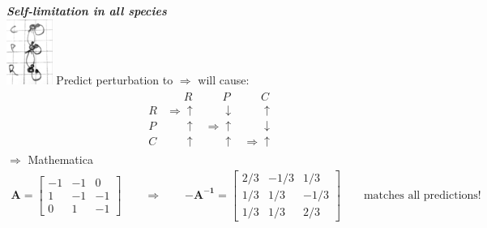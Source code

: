 \documentclass{article}
\newcommand{\ind}{\-\hspace{1cm}}
\begin{document}
\emph{\textbf{Self-limitation in all species}}\\
\ind \includegraphics[width=1.5cm]{figs/TC_full.pdf}
\ind Predict perturbation to $\Rightarrow$ will cause:
\begin{align*}
\begin{matrix}
	 &	\phantom{\Rightarrow} R & \phantom{\Rightarrow}P & \phantom{\Rightarrow}C\\
	R &	\Rightarrow \uparrow & \phantom{\Rightarrow}\downarrow & \phantom{\Rightarrow} \uparrow\\
	P & \phantom{\Rightarrow}\uparrow & \Rightarrow \uparrow & \phantom{\Rightarrow}\downarrow\\
	C & \phantom{\Rightarrow} \uparrow & \phantom{\Rightarrow} \uparrow & \Rightarrow \uparrow
\end{matrix}
\end{align*}
 $\Rightarrow$ Mathematica
\begin{align*}
	\mathbf{A}=\begin{bmatrix} -1 & -1 & 0 \\ 1 & -1 & -1 \\ 0 & 1 & -1 \end{bmatrix} \qquad \Rightarrow \qquad \mathbf{-A^{-1}}=\begin{bmatrix} 2/3 & -1/3 & 1/3 \\ 1/3 & 1/3 & -1/3 \\ 1/3 & 1/3 & 2/3 \end{bmatrix} \qquad \text{matches all predictions!}
\end{align*}
\end{document}
